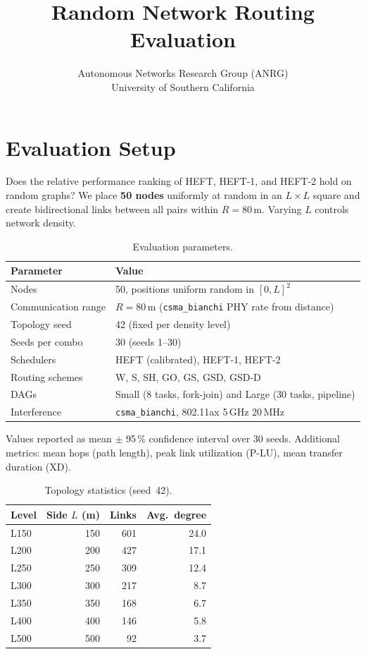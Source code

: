 \documentclass[11pt]{article}
\title{Random Network Routing Evaluation}
\author{Autonomous Networks Research Group (ANRG)\\University of Southern California}
\date{}
\begin{document}
\maketitle
\tableofcontents
\newpage

\section{Evaluation Setup}

Does the relative performance ranking of HEFT, HEFT-1, and HEFT-2 hold
on random graphs?  We place \textbf{50 nodes} uniformly at random in an
$L\times L$ square and create bidirectional links between all pairs within
$R=80$\,m.  Varying $L$ controls network density.

\begin{table}[H]\centering
\begin{tabular}{ll}\toprule
\textbf{Parameter} & \textbf{Value} \\\midrule
Nodes & 50, positions uniform random in $[0,L]^2$ \\
Communication range & $R=80$\,m (\texttt{csma\_bianchi} PHY rate from distance) \\
Topology seed & 42 (fixed per density level) \\
Seeds per combo & 30 (seeds 1--30) \\
Schedulers & HEFT (calibrated), HEFT-1, HEFT-2 \\
Routing schemes & W, S, SH, GO, GS, GSD, GSD-D \\
DAGs & Small (8 tasks, fork-join) and Large (30 tasks, pipeline) \\
Interference & \texttt{csma\_bianchi}, 802.11ax 5\,GHz 20\,MHz \\
\bottomrule\end{tabular}
\caption{Evaluation parameters.}\end{table}

Values reported as mean $\pm$ 95\,\% confidence interval over 30 seeds.
Additional metrics: mean hops (path length), peak link utilization (P-LU), mean transfer duration (XD).

\begin{table}[H]\centering
\begin{tabular}{l r r r}\toprule
\textbf{Level} & \textbf{Side $L$ (m)} & \textbf{Links} & \textbf{Avg.\ degree} \\\midrule
  L150 & 150 & 601 & 24.0 \\
  L200 & 200 & 427 & 17.1 \\
  L250 & 250 & 309 & 12.4 \\
  L300 & 300 & 217 & 8.7 \\
  L350 & 350 & 168 & 6.7 \\
  L400 & 400 & 146 & 5.8 \\
  L500 & 500 & 92 & 3.7 \\
\bottomrule\end{tabular}
\caption{Topology statistics (seed~42).}\end{table}
\end{document}
